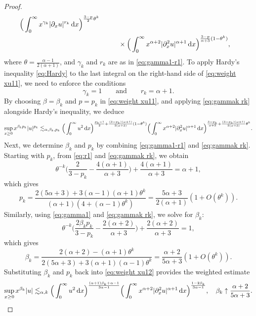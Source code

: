 \documentclass[reqno,12pt]{amsart}
\renewcommand{\d}{\ensuremath{\mathrm{d}}}
\renewcommand{\d}{\ensuremath{{\rm d}}}
\numberwithin{equation}{section}
\begin{document}
\begin{proof}
\begin{align}
\Big( \int_0^\infty x^{\gamma_k}
|\partial_x u|^{r_k} \, \d x \Big)^{\frac{3-p}{2}\theta^k} \nonumber \\
&\phantom{\lesssim_{\alpha,\beta,p}} \times
\Big( \int_0^\infty  x^{\alpha+2} |\partial_x^2 u|^{\alpha+1} \, \d x\Big)^{\frac{3-p}{\alpha+3}(  1- \theta^k)},
	\label{eq:weight xu11}
\end{align}
%
where $\theta = \frac{\alpha-1}{2(\alpha+1)}$, and $\gamma_k$ and $r_k$ are as in \eqref{eq:gamma1-r1}. To apply Hardy’s inequality \eqref{eq:Hardy} to the last integral on the right-hand side of \eqref{eq:weight xu11}, we need to enforce the conditions
%
\begin{equation}\label{eq:gammak rk}
\gamma_k = 1\qquad \text{and} \qquad r_{k} = \alpha +1. 
\end{equation}
%
By choosing \(\beta=\beta_k\) and \(p=p_k\) in \eqref{eq:weight xu11}, and applying \eqref{eq:gammak rk} alongside Hardy’s inequality, we deduce
%
\begin{equation}\label{eq:weight xu12}
\sup_{x \ge 0} x^{\beta_k p_k} |u|^{p_k} 
\lesssim_{\alpha,\beta_k,p_k} \Big(  \int_0^\infty  u^2 \, \d x \Big)^{\frac{p_k-1}{2} + \frac{(3-p_k)(\alpha+1)}{2(\alpha+3)}(1- \theta^k)} 
\Big( \int_0^\infty x^{\alpha+2}|\partial_x^2 u|^{\alpha+1} \, \d x \Big)^{\frac{3-p_k}{\alpha+3} + \frac{(3-p_k)(\alpha+1)}{2(\alpha+3)}\theta^k}.
\end{equation}
%
Next, we determine $\beta_k$ and $p_k$ by combining \eqref{eq:gamma1-r1} and \eqref{eq:gammak rk}. Starting with $p_k$, from \eqref{eq:r1} and \eqref{eq:gammak rk}, we obtain
%
\begin{equation*}
\theta^{-k} \Big( \frac{2}{3-p_k} - \frac{4(\alpha+1)}{\alpha+3} \Big) + \frac{4(\alpha+1)}{\alpha+3} = \alpha +1,
\end{equation*}
%
which gives
%
\begin{equation*}
    p_k = \frac{2(5\alpha+3) + 3 (\alpha-1) (\alpha+1) \theta^k}{(\alpha+1) (4+(\alpha-1)\theta^k)} = \frac{5 \alpha +3}{2(\alpha+1)}(1+ O(\theta^k)). 
\end{equation*}
%
Similarly, using \eqref{eq:gamma1} and \eqref{eq:gammak rk}, we solve for $\beta_k$:
%
\begin{equation*}
\theta^{-k} \Big( \frac{2 \beta_k  p_k}{3-p_k} - \frac{2(\alpha+2)}{\alpha+3} \Big) + \frac{2(\alpha+2)}{\alpha+3} = 1,
\end{equation*}
%
which gives
%
\begin{equation}\label{eq:betak_u}
    \beta_k = \frac{2(\alpha+2) - (\alpha+1) \theta^k}{2 (5\alpha+3) + 3(\alpha+1) (\alpha-1)\theta^k} = \frac{\alpha +2}{5\alpha+3}(1+O(\theta^k)).  
\end{equation}
%
Substituting $\beta_k$ and $p_k$ back into \eqref{eq:weight xu12} provides the weighted estimate
%
\begin{equation}\label{eq:weight xu13}
\sup_{x \ge 0} x^{\beta_k} |u| 
\lesssim_{\alpha,k} \Big(  \int_0^\infty  u^2 \, \d x \Big)^{\frac{(\alpha+1) \beta_k+\alpha-1}{3\alpha-1}}  \Big( \int_0^\infty x^{\alpha+2}
|\partial_x^2 u|^{\alpha+1} \, \d x \Big)^{\frac{1-2\beta_k}{3\alpha-1}}, \quad \beta_k \uparrow \frac{\alpha +2}{5\alpha+3}.
\end{equation}
%


\end{proof}
\end{document}
